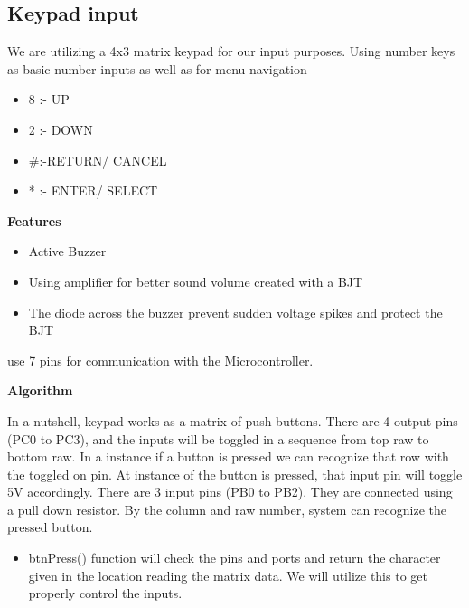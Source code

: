 \newpage
\subsection{Keypad input}

We are utilizing a 4x3 matrix keypad for our input purposes. Using number keys as basic number inputs as well as for menu navigation

\normalsize
\begin{itemize}
    \item 8 :- UP
	\item 2 :- DOWN
	\item \#:-RETURN/ CANCEL
	\item * :- ENTER/ SELECT
\end{itemize}

\Large \textbf{Features}
\normalsize
\begin{itemize}
  \item Active Buzzer 
  \item Using amplifier for better sound volume created with a BJT
  \item The diode across the buzzer prevent sudden voltage spikes and protect the BJT	
\end{itemize}

use 7 pins for communication with the Microcontroller.
\vspace{5mm}

\Large \textbf{Algorithm}

\normalsize{In a nutshell, keypad works as a matrix of push buttons. There are 4 output pins (PC0 to PC3), and the inputs will be toggled in a sequence from top raw to bottom raw. In a instance if a button is pressed we can recognize that row with the toggled on pin. At instance of the button is pressed, that input pin will toggle 5V accordingly. There are 3 input pins (PB0 to PB2). They are connected using a pull down resistor. By the column and raw number, system can recognize the pressed button.}

\begin{itemize}
  \item btnPress() function will check the pins and ports and return the character given in the location reading the matrix data. We will utilize this to get properly control the inputs. 
\end{itemize}



